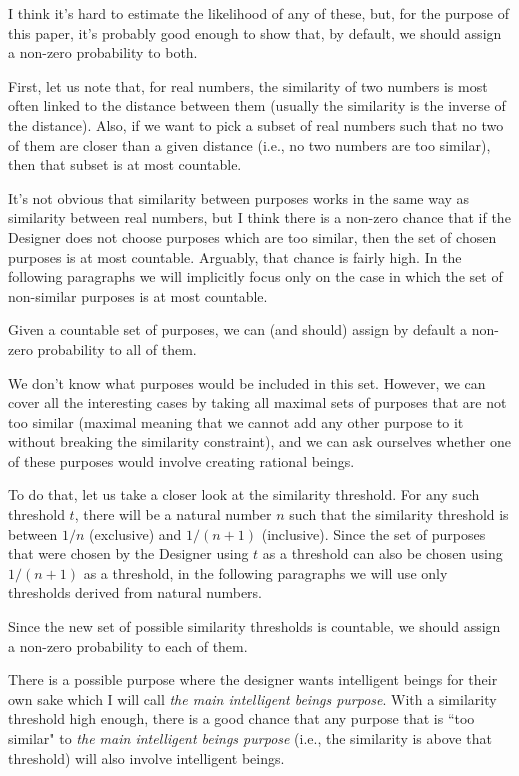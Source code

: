 \documentclass[a4paper
,draft
]{article}
\newcommand{\paper}[1]{paper}
\newcommand{\ghilimele}[1]{``#1"}
\begin{document}
I think it's hard to estimate the likelihood of any of these, but, for the
purpose of this \paper{}, it's probably good enough to show that, by default,
we should assign a non-zero probability to both.

First, let us note that, for real numbers, the similarity of two numbers
is most often linked to the distance between them
(usually the similarity is the inverse of the distance).
Also, if we want to pick a subset of real numbers such that no two of them are
closer than a given distance (i.e., no two numbers are too similar),
then that subset is at most countable.

It's not obvious that
similarity between purposes works in the same way as similarity between
real numbers, but I think there is a non-zero chance
that if the Designer does not choose purposes which are too similar,
then the set of chosen purposes is at most countable.
Arguably, that chance is fairly high.
In the following paragraphs we will implicitly focus only on the case in which
the set of non-similar purposes is at most countable.

Given a countable set of purposes, we can (and should) assign by default
a non-zero probability to all of them.

We don't know what purposes would be included in this set.
However, we can cover all the interesting cases by taking all maximal sets of
purposes that are not too similar
(maximal meaning that we cannot add any other purpose to it without breaking
the similarity constraint), and we can ask ourselves whether one of these
purposes would involve creating rational beings.

To do that, let us take a closer look at the similarity threshold.
For any such threshold $t$,
there will be a natural number $n$ such that the similarity threshold is between
$1/n$ (exclusive) and $1/(n+1)$ (inclusive).
Since the set of purposes that were chosen by the Designer using $t$ as a
threshold can also be chosen
using $1/(n+1)$ as a threshold, in the following paragraphs we will use only
thresholds derived from natural numbers.

Since the new set of possible similarity thresholds is countable,
we should assign a non-zero probability to each of them.

There is a possible purpose where the designer wants intelligent beings
for their own sake which I will call
\textit{the main intelligent beings purpose}.
With a similarity threshold
high enough, there is a good chance that any purpose that is \ghilimele{too similar} to \textit{the
main intelligent beings purpose} (i.e., the similarity is above that threshold) will also involve
intelligent beings.
\end{document}
